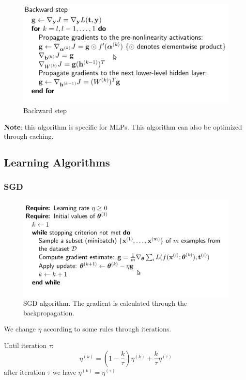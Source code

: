 \begin{figure}[H]
    \centering
    \includegraphics[width=15cm]{images/FNN/backprop_backward_Step.png}
    \caption{Backward step}
    \label{fig:backw_step}
\end{figure}

\textbf{Note}: this algorithm is specific for MLPs. This algorithm can also be optimized through caching.

\subsection{Learning Algorithms}
\subsubsection{SGD}

\begin{figure}[H]
    \centering
    \includegraphics[width=15cm]{images/FNN/SGD.png}
    \caption{SGD algorithm. The gradient is calculated through the backpropagation.}
    \label{fig:sgd}
\end{figure}

We change $\eta$ according to some rules through iterations.

Until iteration $\tau$:
\begin{equation}
    \eta^{(k)} = \left(1 - \frac{k}{\tau}\right)\eta^{(k)} + \frac{k}{\tau}\eta^{(\tau)}
\end{equation}
after iteration $\tau$ we have $\eta^{(k)} = \eta^{(\tau)}$

